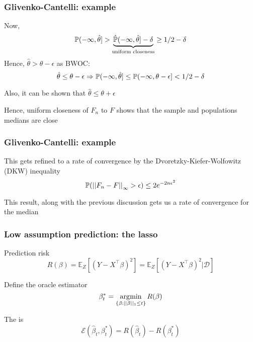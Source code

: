 \documentclass[12pt]{beamer}
\begin{document}
\begin{frame}[fragile]
\frametitle{Glivenko-Cantelli: example}
Now, 
\[
\P(-\infty,\hat\theta] > \underbrace{\hat\P(-\infty,\hat\theta] - \delta}_{\textrm{uniform closeness}} \geq 1/2 - \delta
\]
Hence, $\hat\theta > \theta - \epsilon$ as BWOC: 
\[
\hat\theta \leq \theta - \epsilon \Rightarrow\P(-\infty,\hat\theta]  \leq\P(-\infty,\theta - \epsilon] < 1/2 - \delta
\]
\vsp

%
Also, it can be shown that $\hat\theta \leq \theta + \epsilon$

\vsp
Hence, uniform closeness of $F_n$ to $F$ shows that the sample and populations medians are close


\end{frame}

\begin{frame}[fragile]
\frametitle{Glivenko-Cantelli: example}
This gets refined to a rate of convergence by the Dvoretzky-Kiefer-Wolfowitz (DKW) inequality 
\[
\P( \norm{F_n - F}_{\infty} > \epsilon) \leq 2e^{-2n\epsilon^2}
\]

\vsp
This result, along with the previous discussion gets us a rate of convergence for the median
\end{frame}



\begin{frame}
\frametitle{Low assumption prediction: the lasso}
  Prediction risk
  \[
  R(\beta) 
  = 
  \mathbb{E}_Z \left[\left(Y - X^\top \beta\right)^2 \right]
  =
  \mathbb{E}_Z \left[\left(Y - X^\top \beta\right)^2 | \mathcal{D}\right]
  \]

  \vsp
  Define the oracle estimator
  \[
  \beta_t^* = \argmin_{\{\beta:||\beta||_1 \leq t\}} R(\beta)
  \]

  \vsp
  The  is
  \[
  \mathcal{E}(\hat\beta_t,\beta_t^*) = R(\hat\beta_t) - R(\beta_t^*)
  \]
\end{frame}
\end{document}

